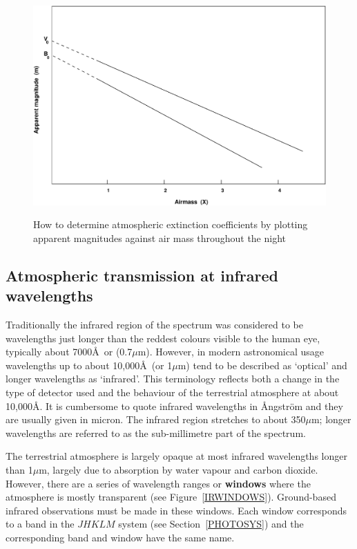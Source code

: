 \documentclass[twoside,11pt]{article}
\begin{document}
\begin{figure}[htbp]
   \centering
   \includegraphics[totalheight=4.5in,angle=270]{sc6_airmass}
   \begin{quote}
   \caption{How to determine atmospheric extinction coefficients by
    plotting apparent magnitudes against air mass throughout the night
   \label{AIRMASSP} }
   \end{quote}
\end{figure}

\subsection{\label{IRATMOS}Atmospheric transmission at infrared wavelengths}

Traditionally the infrared region of the spectrum was considered to be
wavelengths just longer than the reddest colours visible to the human
eye, typically about 7000\AA ~or (0.7$\mu$m).  However, in modern
astronomical usage wavelengths up to about 10,000\AA ~(or 1$\mu$m) tend
to be described as `optical' and longer wavelengths as `infrared'.  This
terminology reflects both a change in the type of detector used and the
behaviour of the terrestrial atmosphere at about 10,000\AA .  It is
cumbersome to quote infrared wavelengths in \AA ngstr\"{o}m and they are
usually given in micron.  The infrared region stretches to about 350$\mu$m;
longer wavelengths are referred to as the sub-millimetre part of the
spectrum.

The terrestrial atmosphere is largely opaque at most infrared wavelengths
longer than 1$\mu$m, largely due to absorption by water vapour and
carbon dioxide.  However, there are a series of wavelength ranges or
{\bf windows} where the atmosphere is mostly transparent (see
Figure~\ref{IRWINDOWS}).  Ground-based infrared observations must be
made in these windows.  Each window corresponds to a band in the $JHKLM$
system (see Section~\ref{PHOTOSYS}) and the corresponding band and window
have the same name.
\end{document}
